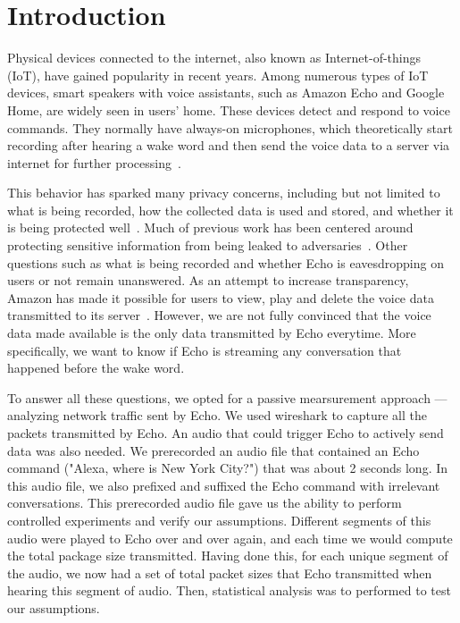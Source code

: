 \section{Introduction}
Physical devices connected to the internet, also known as Internet-of-things (IoT), have gained popularity in recent years. Among numerous types of IoT devices, smart speakers with voice assistants, such as Amazon Echo and Google Home, are widely seen in users' home. These devices detect and respond to voice commands. They normally have always-on microphones, which theoretically start recording after hearing a wake word and then send the voice data to a server via internet for further processing~\cite{AmazonEc68:online}.

This behavior has sparked many privacy concerns, including but not limited to what is being recorded, how the collected data is used and stored, and whether it is being protected well~\cite{lau2018alexa, fowler_2019, apthorpe2017smart, apthorpe2019keeping, apthorpe2017spying}. Much of previous work has been centered around protecting sensitive information from being leaked to adversaries~\cite{apthorpe2017smart, apthorpe2019keeping, apthorpe2017spying}. Other questions such as what is being recorded and whether Echo is eavesdropping on users or not remain unanswered. As an attempt to increase transparency, Amazon has made it possible for users to view, play and delete the voice data transmitted to its server~\cite{ford2019alexa}. However, we are not fully convinced that the voice data made available is the only data transmitted by Echo everytime. More specifically, we want to know if Echo is streaming any conversation that happened before the wake word.  

To answer all these questions, we opted for a passive mearsurement approach --- analyzing network traffic sent by Echo. We used wireshark to capture all the packets transmitted by Echo. An audio that could trigger Echo to actively send data was also needed. We prerecorded an audio file that contained an Echo command ("Alexa, where is New York City?") that was about 2 seconds long. In this audio file, we also prefixed and suffixed the Echo command with irrelevant conversations. This prerecorded audio file gave us the ability to perform controlled experiments and verify our assumptions. Different segments of this audio were played to Echo over and over again, and each time we would compute the total package size transmitted. Having done this, for each unique segment of the audio, we now had a set of total packet sizes that Echo transmitted when hearing this segment of audio. Then, statistical analysis was to performed to test our assumptions.

